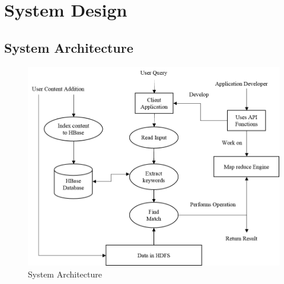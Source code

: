 \chapter{System Design}
\section{System Architecture}

\begin{figure}[h]
\begin{center}
\includegraphics{data_flow}
\end{center}
\caption{System Architecture}
\end{figure}

